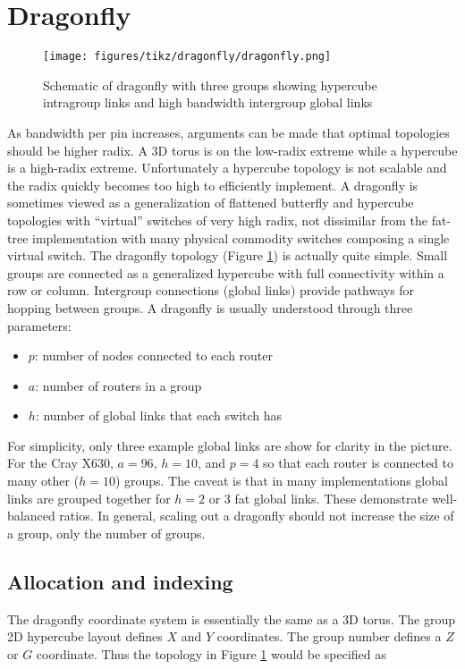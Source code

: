 
\section{Dragonfly}
\label{sec:tutorial:dragonfly}

\begin{figure}[h!]
\centering
\texttt{[image: figures/tikz/dragonfly/dragonfly.png]}
\caption{Schematic of dragonfly with three groups showing hypercube intragroup links and high bandwidth intergroup global links}
\label{fig:topologies:dragonfly}
\end{figure}

As bandwidth per pin increases, arguments can be made that optimal topologies should be higher radix.
A 3D torus is on the low-radix extreme while a hypercube is a high-radix extreme.
Unfortunately a hypercube topology is not scalable and the radix quickly becomes too high to efficiently implement.
A dragonfly is sometimes viewed as a generalization of flattened butterfly and hypercube topologies with ``virtual'' switches of very high radix,
not dissimilar from the fat-tree implementation with many physical commodity switches composing a single virtual switch.
The dragonfly topology (Figure \ref{fig:topologies:dragonfly}) is actually quite simple. 
Small groups are connected as a generalized hypercube with full connectivity within a row or column.
Intergroup connections (global links) provide pathways for hopping between groups.
A dragonfly is usually understood through three parameters:
\begin{itemize}
\item $p$: number of nodes connected to each router
\item $a$: number of routers in a group
\item $h$: number of global links that each switch has
\end{itemize}

For simplicity, only three example global links are show for clarity in the picture.
For the Cray X630, $a = 96$, $h=10$, and $p=4$ so that each router is connected to many other ($h=10$) groups.
The caveat is that in many implementations global links are grouped together for $h=2$ or $3$ fat global links.
These demonstrate well-balanced ratios.
In general, scaling out a dragonfly should not increase the size of a group, only the number of groups.

\subsection{Allocation and indexing}
The dragonfly coordinate system is essentially the same as a 3D torus.  
The group 2D hypercube layout defines $X$ and $Y$ coordinates.
The group number defines a $Z$ or $G$ coordinate.
Thus the topology in Figure \ref{fig:topologies:dragonfly} would be specified as

